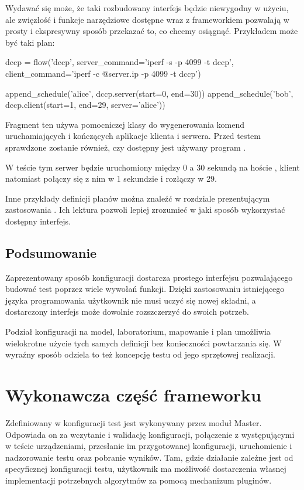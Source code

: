 \documentclass[00-praca-magisterska.tex]{subfiles}
\begin{document}
Wydawać się może, że taki rozbudowany interfejs będzie niewygodny w użyciu, ale
zwięzłość i funkcje narzędziowe dostępne wraz z frameworkiem pozwalają w prosty
i ekspresywny sposób przekazać to, co chcemy osiągnąć. Przykładem może być taki
plan:

\begin{pythoncode}
  dccp = flow('dccp',
      server_command='iperf -s -p 4099 -t dccp',
      client_command='iperf -c @{server.ip} -p 4099 -t dccp')

  append_schedule('alice', dccp.server(start=0, end=30))
  append_schedule('bob',   dccp.client(start=1, end=29, server='alice'))
\end{pythoncode}

Fragment ten używa pomocniczej klasy  do wygenerowania komend
uruchamiających i kończących aplikacje klienta i serwera. Przed testem
sprawdzone zostanie również, czy dostępny jest używany program .

W teście tym serwer będzie uruchomiony między 0 a 30 sekundą na
hoście , klient natomiast połączy się z nim w 1 sekundzie i rozłączy
w 29.

Inne przykłady definicji planów można znaleźć w rozdziale prezentującym
zastosowania . Ich lektura pozwoli lepiej zrozumieć
w jaki sposób wykorzystać dostępny interfejs.

\subsection{Podsumowanie}

Zaprezentowany sposób konfiguracji dostarcza prostego interfejsu pozwalającego
budować test poprzez wiele wywołań funkcji. Dzięki zastosowaniu istniejącego
języka programowania użytkownik nie musi uczyć się nowej składni, a dostarczony
interfejs może dowolnie rozszczerzyć do swoich potrzeb.

Podział konfiguracji na model, laboratorium, mapowanie i plan umożliwia
wielokrotne użycie tych samych definicji bez konieczności powtarzania się. W
wyraźny sposób odziela to też koncepcję testu od jego sprzętowej realizacji.

\section{Wykonawcza część frameworku}

Zdefiniowany w konfiguracji test jest wykonywany przez moduł Master. Odpowiada
on za wczytanie i walidację konfiguracji, połączenie z występującymi w teście
urządzeniami, przesłanie im przygotowanej konfiguracji, uruchomienie i
nadzorowanie testu oraz pobranie wyników. Tam, gdzie działanie zależne
jest od specyficznej konfiguracji testu, użytkownik ma możliwość dostarczenia
własnej implementacji potrzebnych algorytmów za pomocą mechanizum pluginów.
\end{document}
